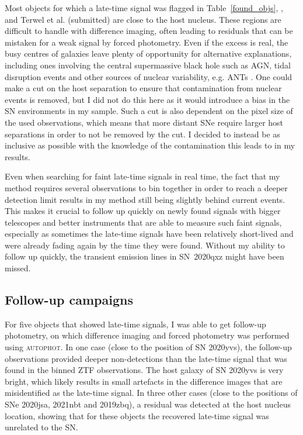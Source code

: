 \documentclass[a4paper,oneside,12pt, class=Latex/Classes/PhDthesisPSnPDF, crop=false]{standalone}
\begin{document}
Most objects for which a late-time signal was flagged in Table~\ref{found_objs}, \citet{Terwel_2024_paper1}, and Terwel et al. (submitted) are close to the host nucleus. These regions are difficult to handle with difference imaging, often leading to residuals that can be mistaken for a weak signal by forced photometry. Even if the excess is real, the busy centres of galaxies leave plenty of opportunity for alternative explanations, including ones involving the central supermassive black hole such as AGN, tidal disruption events and other sources of nuclear variability, e.g. ANTs \citep{2020ohl_Hinkle}. One could make a cut on the host separation to ensure that contamination from nuclear events is removed, but I did not do this here as it would introduce a bias in the SN environments in my sample. Such a cut is also dependent on the pixel size of the used observations, which means that more distant SNe require larger host separations in order to not be removed by the cut. I decided to instead be as inclusive as possible with the knowledge of the contamination this leads to in my results.

Even when searching for faint late-time signals in real time, the fact that my method requires several observations to bin together in order to reach a deeper detection limit results in my method still being slightly behind current events. This makes it crucial to follow up quickly on newly found signals with bigger telescopes and better instruments that are able to measure such faint signals, especially as sometimes the late-time signals have been relatively short-lived and were already fading again by the time they were found. Without my ability to follow up quickly, the transient emission lines in SN~2020qxz might have been missed.


\subsection{Follow-up campaigns}
For five objects that showed late-time signals, I was able to get follow-up photometry, on which difference imaging and forced photometry was performed using \textsc{autophot}. In one case (close to the position of SN 2020yvs), the follow-up observations provided deeper non-detections than the late-time signal that was found in the binned ZTF observations. The host galaxy of SN 2020yvs is very bright, which likely results in small artefacts in the difference images that are misidentified as the late-time signal. In three other cases (close to the positions of SNe 2020jsa, 2021nbt and 2019zbq), a residual was detected at the host nucleus location, showing that for these objects the recovered late-time signal was unrelated to the SN.
\end{document}
